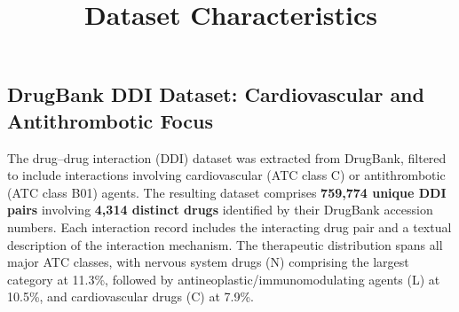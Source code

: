\documentclass[11pt]{article}
\title{Dataset Characteristics}
\author{}
\date{}
\begin{document}
\maketitle

\subsection*{DrugBank DDI Dataset: Cardiovascular and Antithrombotic Focus}

The drug--drug interaction (DDI) dataset was extracted from DrugBank, filtered to include interactions involving cardiovascular (ATC class C) or antithrombotic (ATC class B01) agents. The resulting dataset comprises \textbf{759,774 unique DDI pairs} involving \textbf{4,314 distinct drugs} identified by their DrugBank accession numbers. Each interaction record includes the interacting drug pair and a textual description of the interaction mechanism. The therapeutic distribution spans all major ATC classes, with nervous system drugs (N) comprising the largest category at 11.3\%, followed by antineoplastic/immunomodulating agents (L) at 10.5\%, and cardiovascular drugs (C) at 7.9\%.

\vspace{1em}
\end{document}
